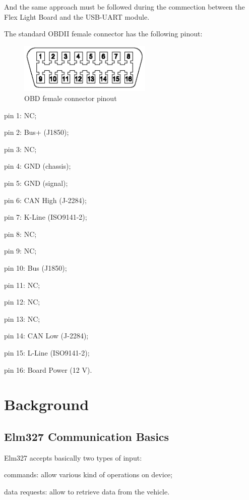 \documentclass[twoside]{article}
\begin{document}
\begin{multicols}{2}
And the same approach must be followed during the commection between the Flex Light Board and the USB-UART module.

The standard OBDII female connector has the following pinout:

\begin{figure}[H]
  \centering
  \includegraphics[width=2.5in]{img/J1962_female_pinout}
  \caption{OBD female connector pinout}
\end{figure}

\begin{compactitem}
\item pin 1: NC;
\item pin 2: Bus+ (J1850);
\item pin 3: NC;
\item pin 4: GND (chassis);
\item pin 5: GND (signal);
\item pin 6: CAN High (J-2284);
\item pin 7: K-Line (ISO9141-2);
\item pin 8: NC;
\item pin 9: NC;
\item pin 10: Bus (J1850);
\item pin 11: NC;
\item pin 12: NC;
\item pin 13: NC;
\item pin 14: CAN Low (J-2284);
\item pin 15: L-Line (ISO9141-2);
\item pin 16: Board Power (12 V).
\end{compactitem}



\section{Background}

\subsection{Elm327 Communication Basics}

Elm327 accepts basically two types of input:
\begin{compactitem}
  \item commands: allow various kind of operations on device;
  \item data requests: allow to retrieve data from the vehicle.
\end{compactitem}


\end{multicols}
\end{document}
